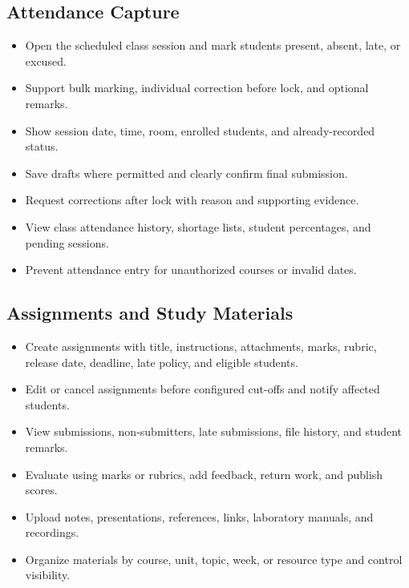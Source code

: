 \documentclass[10pt,a4paper]{article}
\begin{document}
\subsection{Attendance Capture}
\begin{itemize}
  \item Open the scheduled class session and mark students present, absent, late, or excused.
  \item Support bulk marking, individual correction before lock, and optional remarks.
  \item Show session date, time, room, enrolled students, and already-recorded status.
  \item Save drafts where permitted and clearly confirm final submission.
  \item Request corrections after lock with reason and supporting evidence.
  \item View class attendance history, shortage lists, student percentages, and pending sessions.
  \item Prevent attendance entry for unauthorized courses or invalid dates.
\end{itemize}

\subsection{Assignments and Study Materials}
\begin{itemize}
  \item Create assignments with title, instructions, attachments, marks, rubric,
        release date, deadline, late policy, and eligible students.
  \item Edit or cancel assignments before configured cut-offs and notify affected students.
  \item View submissions, non-submitters, late submissions, file history, and student remarks.
  \item Evaluate using marks or rubrics, add feedback, return work, and publish scores.
  \item Upload notes, presentations, references, links, laboratory manuals, and recordings.
  \item Organize materials by course, unit, topic, week, or resource type and control visibility.
\end{itemize}
\end{document}
